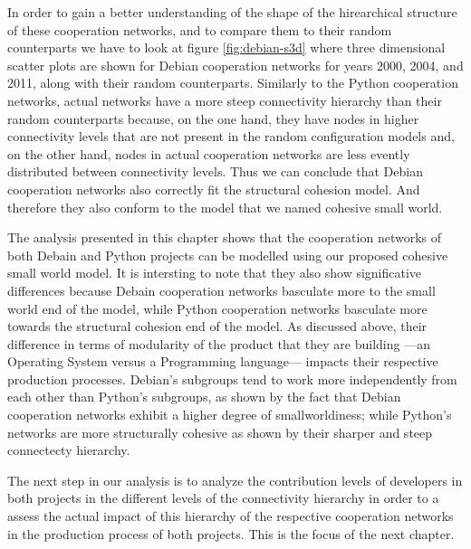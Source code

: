 In order to gain a better understanding of the shape of the hirearchical structure of these cooperation networks, and to compare them to their random counterparts we have to look at figure \ref{fig:debian-s3d} where three dimensional scatter plots are shown for Debian cooperation networks for years 2000, 2004, and 2011, along with their random counterparts. Similarly to the Python cooperation networks, actual networks have a more steep connectivity hierarchy than their random counterparts because, on the one hand, they have nodes in higher connectivity levels that are not present in the random configuration models and, on the other hand, nodes in actual cooperation networks are less evently distributed between connectivity levels. Thus we can conclude that Debian cooperation networks also correctly fit the structural cohesion model. And therefore they also conform to the model that we named cohesive small world.

The analysis presented in this chapter shows that the cooperation networks of both Debain and Python projects can be modelled using our proposed cohesive small world model. It is intersting to note that they also show significative differences because Debain cooperation networks basculate more to the small world end of the model, while Python cooperation networks basculate more towards the structural cohesion end of the model. As discussed above, their difference in terms of modularity of the product that they are building ---an Operating System versus a Programming language--- impacts their respective production processes. Debian's subgroups tend to work more independently from each other than Python's subgroups, as shown by the fact that Debian cooperation networks exhibit a higher degree of smallworldiness; while Python's networks are more structurally cohesive as shown by their sharper and steep connectecty hierarchy.

The next step in our analysis is to analyze the contribution levels of developers in both projects in the different levels of the connectivity hierarchy in order to a assess the actual impact of this hierarchy of the respective cooperation networks in the production process of both projects. This is the focus of the next chapter.


